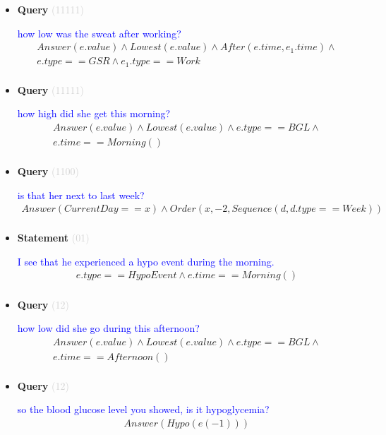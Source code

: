 \documentclass[11pt]{article}
\newcommand{\key}[1]{\textcolor{lightgray}{#1}}
\newcounter{CQuery}
\newcounter{CStatement}
\begin{document}
\begin{itemize}
\item
\textbf{Query\theCQuery} \key{(11111)} \addtocounter{CQuery}{1}
\textcolor{blue}{ how low was the sweat after working? }
\begin{multline*}
Answer(e.value) \wedge Lowest(e.value) \wedge After(e.time, e_1.time) \wedge \\ 
e.type==GSR \wedge e_1.type==Work \\ 
\end{multline*}


\item
\textbf{Query\theCQuery} \key{(11111)} \addtocounter{CQuery}{1}
\textcolor{blue}{ how high did she get this morning? }
\begin{multline*}
Answer(e.value) \wedge Lowest(e.value) \wedge e.type==BGL \wedge \\ 
e.time==Morning() \\ 
\end{multline*}


\item
\textbf{Query\theCQuery} \key{(1100)} \addtocounter{CQuery}{1}
\textcolor{blue}{ is that her next to last week? }
\begin{multline*}
Answer(CurrentDay==x) \wedge Order(x, -2, Sequence(d, d.type==Week)) \\ 
\end{multline*}


\item
\textbf{Statement\theCStatement} \key{(01)} \addtocounter{CStatement}{1}
\textcolor{blue}{ I see that he experienced a hypo event during the morning. }
\begin{multline*}
e.type==HypoEvent \wedge e.time==Morning() \\ 
\end{multline*}


\item
\textbf{Query\theCQuery} \key{(12)} \addtocounter{CQuery}{1}
\textcolor{blue}{ how low did she go during this afternoon? }
\begin{multline*}
Answer(e.value) \wedge Lowest(e.value) \wedge e.type==BGL \wedge \\ 
e.time==Afternoon() \\ 
\end{multline*}


\item
\textbf{Query\theCQuery} \key{(12)} \addtocounter{CQuery}{1}
\textcolor{blue}{ so the blood glucose level you showed, is it hypoglycemia? }
\begin{multline*}
Answer(Hypo(e(-1))) \\ 
\end{multline*}



\end{itemize}
\end{document}
